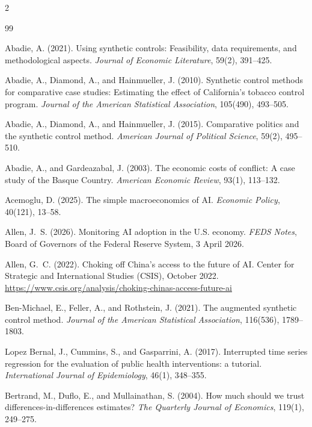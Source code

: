 \documentclass[11pt]{article}
\begin{document}
\scriptsize
\begin{multicols}{2}
\raggedright
\begin{thebibliography}{99}
\setlength{\itemsep}{1pt}\setlength{\parskip}{0pt}

Abadie, A. (2021).
Using synthetic controls: Feasibility, data requirements, and methodological
aspects.
\emph{Journal of Economic Literature}, 59(2), 391--425.

Abadie, A., Diamond, A., and Hainmueller, J. (2010).
Synthetic control methods for comparative case studies: Estimating the effect
of California's tobacco control program.
\emph{Journal of the American Statistical Association}, 105(490), 493--505.

Abadie, A., Diamond, A., and Hainmueller, J. (2015).
Comparative politics and the synthetic control method.
\emph{American Journal of Political Science}, 59(2), 495--510.

Abadie, A., and Gardeazabal, J. (2003).
The economic costs of conflict: A case study of the Basque Country.
\emph{American Economic Review}, 93(1), 113--132.

Acemoglu, D. (2025).
The simple macroeconomics of AI.
\emph{Economic Policy}, 40(121), 13--58.

Allen, J.~S. (2026).
Monitoring AI adoption in the U.S. economy.
\emph{FEDS Notes}, Board of Governors of the Federal Reserve System, 3 April
2026.

Allen, G.~C. (2022).
Choking off China's access to the future of AI.
Center for Strategic and International Studies (CSIS), October 2022.
\url{https://www.csis.org/analysis/choking-chinas-access-future-ai}

Ben-Michael, E., Feller, A., and Rothstein, J. (2021).
The augmented synthetic control method.
\emph{Journal of the American Statistical Association}, 116(536), 1789--1803.

Lopez Bernal, J., Cummins, S., and Gasparrini, A. (2017).
Interrupted time series regression for the evaluation of public health
interventions: a tutorial.
\emph{International Journal of Epidemiology}, 46(1), 348--355.

Bertrand, M., Duflo, E., and Mullainathan, S. (2004).
How much should we trust differences-in-differences estimates?
\emph{The Quarterly Journal of Economics}, 119(1), 249--275.


\end{thebibliography}
\end{multicols}
\end{document}
